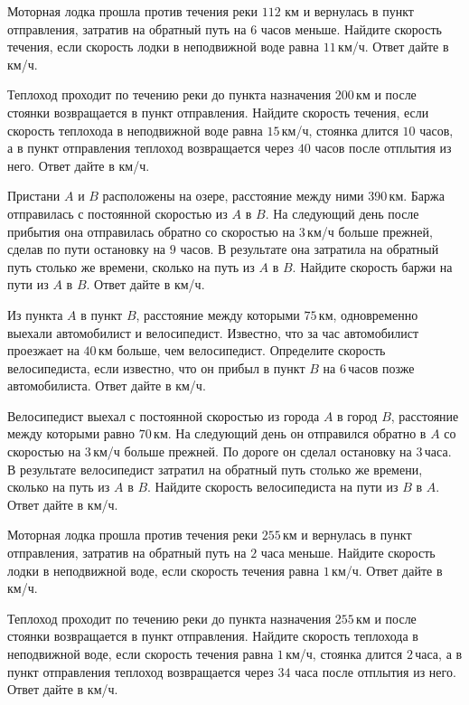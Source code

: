 \begin{class}[number=3]
	\begin{listofex}
		\item Моторная лодка прошла против течения реки \( 112  \) км и вернулась в пункт отправления, затратив на обратный путь на \( 6 \) часов меньше. Найдите скорость течения, если скорость лодки в неподвижной воде равна \( 11 \) км/ч. Ответ дайте в км/ч.
		\item Теплоход проходит по течению реки до пункта назначения \( 200 \) км и после стоянки возвращается в пункт отправления. Найдите скорость течения, если скорость теплохода в неподвижной воде равна \( 15 \) км/ч, стоянка длится \( 10 \) часов, а в пункт отправления теплоход возвращается через \( 40 \) часов после отплытия из него. Ответ дайте в км/ч.
		\item Пристани \( A \) и \( B \) расположены на озере, расстояние между ними 390 км. Баржа отправилась с постоянной скоростью из \( A \) в \( B \). На следующий день после прибытия она отправилась обратно со скоростью на \( 3 \) км/ч больше прежней, сделав по пути остановку на \( 9 \) часов. В результате она затратила на обратный путь столько же времени, сколько на путь из \( A \) в \( B \). Найдите скорость баржи на пути из \( A \) в \( B \). Ответ дайте в км/ч.
		\item Из пункта \( A \) в пункт \( B \), расстояние между которыми \( 75 \) км, одновременно выехали автомобилист и велосипедист. Известно, что за час автомобилист проезжает на \( 40 \) км больше, чем велосипедист. Определите скорость велосипедиста, если известно, что он прибыл в пункт \( B \) на \( 6 \) часов позже автомобилиста. Ответ дайте в км/ч.
		\item Велосипедист выехал с постоянной скоростью из города \( A \) в город \( B \), расстояние между которыми равно \( 70 \) км. На следующий день он отправился обратно в \( A \) со скоростью на \( 3 \) км/ч больше прежней. По дороге он сделал остановку на \( 3 \) часа. В результате велосипедист затратил на обратный путь столько же времени, сколько на путь из \( A \) в \( B \). Найдите скорость велосипедиста на пути из \( B \) в \( A \). Ответ дайте в км/ч.
		\item Моторная лодка прошла против течения реки \( 255 \) км и вернулась в пункт отправления, затратив на обратный путь на \( 2 \) часа меньше. Найдите скорость лодки в неподвижной воде, если скорость течения равна \( 1 \) км/ч. Ответ дайте в км/ч.
		\item Теплоход проходит по течению реки до пункта назначения \( 255 \) км и после стоянки возвращается в пункт отправления. Найдите скорость теплохода в неподвижной воде, если скорость течения равна \( 1 \) км/ч, стоянка длится \( 2 \) часа, а в пункт отправления теплоход возвращается через \( 34 \) часа после отплытия из него. Ответ дайте в км/ч.

\end{listofex}
\end{class}
